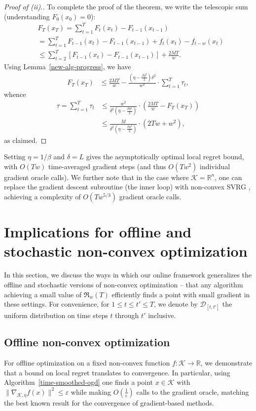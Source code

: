 \documentclass{article}
\def\reals{{\mathbb R}}
\def\reals{{\mathbb R}}
\newcommand{\K}{\ensuremath{\mathcal K}}
\def\eps{\varepsilon}
\newcommand{\pa}[1]{\left(#1\right)}
\newcommand{\bra}[1]{\left[#1\right]}
\newcommand{\R}{\mathbb{R}}
\renewcommand{\K}{\mathcal{K}}
\newcommand{\regret}{\mathfrak{R}}
\begin{document}
\begin{proof}[Proof of (ii).]
To complete the proof of the theorem, we write the telescopic sum (understanding $F_{0}(x_0) = 0$):
\begin{align*}
&F_T(x_T) = \sum_{t=1}^{T} F_{t}(x_{t}) - F_{t-1}(x_{t-1}) \\
&= \sum_{t=1}^{T} F_{t-1}(x_t) - F_{t-1}(x_{t-1}) + f_t(x_t) - f_{t-w}(x_t) \\
&\leq \sum_{t=2}^{T} \bra{ F_{t-1}(x_t) - F_{t-1}(x_{t-1}) } + \frac{2MT}{w}.
\end{align*}
Using Lemma~\ref{new-alg-progress}, we have
\begin{align*}
F_T(x_T) &\leq \frac{2MT}{w} - \frac{\pa{\eta - \frac{\beta \eta^2}{2}} \delta^2}{w^2} \cdot \sum_{t=1}^T \tau_t,
\end{align*}
whence
\begin{align*}
\tau = \sum_{t=1}^T \tau_t &\leq \frac{w^2}{\delta^2 \pa{\eta - \frac{\beta \eta^2}{2}}} \cdot \pa{ \frac{2MT}{w} - F_T(x_T) } \\
&\leq \frac{M}{\delta^2 \pa{\eta - \frac{\beta \eta^2}{2}}} \cdot \pa{2Tw + w^2},
\end{align*}
as claimed.
\end{proof}
Setting $\eta = 1/\beta$ and $\delta = L$ gives the asymptotically optimal local regret bound, with $O(Tw)$ time-averaged gradient steps (and thus $O(Tw^2)$ individual gradient oracle calls). We further note that in the case where $\K = \R^n$, one can replace the gradient descent subroutine (the inner loop) with non-convex SVRG \cite{allen2016variance}, achieving a complexity of $O(Tw^{5/3})$ gradient oracle calls.





 
\section{Implications for offline and stochastic non-convex optimization}
\label{reduction-section}

In this section, we discuss the ways in which our online framework generalizes the offline and stochastic versions of non-convex optimization -- that any algorithm achieving a small value of $\regret_w(T)$ efficiently finds a point with small gradient in these settings. For convenience, for $1 \leq t \leq t' \leq T$, we denote by $\mathcal{D}_{[t,t']}$ the uniform distribution on time steps $t$ through $t'$ inclusive.

\subsection{Offline non-convex optimization}
For offline optimization on a fixed non-convex function $f:\K\to\reals$, we demonstrate that a bound on local regret translates to convergence. In particular, using Algorithm~\ref{time-smoothed-ogd} one finds a point $x\in\K$ with $\|\nabla_{\K,\eta} f(x)\|^2\leq \eps$ while making $O\left(\frac{1}{\eps}\right)$ calls to the gradient oracle, matching the best known result for the convergence of gradient-based methods.
\end{document}
